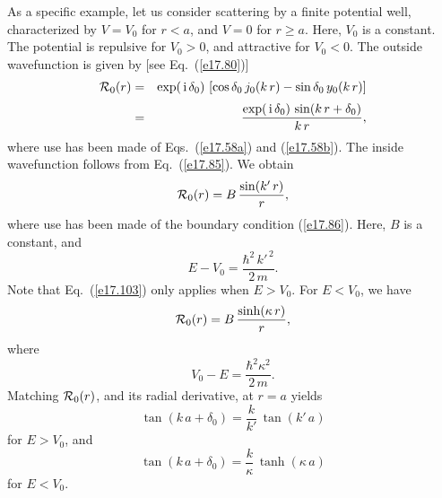As a specific example, let us consider scattering by  a finite
potential well, characterized by $V=V_0$ for $r<a$, and
$V=0$ for $r\geq a$. Here, $V_0$ is a constant. The potential
is repulsive for $V_0>0$, and attractive for $V_0<0$. 
The outside wavefunction is given by [see Eq.~(\ref{e17.80})]
\begin{eqnarray}
{\cal R}_0(r) &=& \exp(\,{\rm i}\, \delta_0)\,\left[
\cos\delta_0\,j_0(k\,r)  - \sin\delta_0\,y_0(k\,r) \right]\nonumber\\[0.5ex]
&=& \frac{ \exp(\,{\rm i} \,\delta_0)\, \sin(k\,r+\delta_0)}{k\,r},
\end{eqnarray}
where use has been made of Eqs.~(\ref{e17.58a}) and (\ref{e17.58b}).
The inside wavefunction follows from Eq.~(\ref{e17.85}). We obtain
\begin{equation}\label{e17.103}
{\cal R}_0(r) = B \,\frac{\sin (k'\,r)}{r},
\end{equation}
where use has been made of the boundary condition (\ref{e17.86}).
Here, $B$ is a constant, and 
\begin{equation}
E - V_0 = \frac{\hbar^2 \,k'^{\,2}}{2\,m}.
\end{equation}
Note that Eq.~(\ref{e17.103}) only applies when $E>V_0$. For $E<V_0$, we have
\begin{equation}
{\cal R}_0(r) = B \,\frac{\sinh(\kappa\, r)}{r},
\end{equation}
where
\begin{equation}
V_0 - E = \frac{\hbar^2 \kappa^2}{2\,m}.
\end{equation}
Matching ${\cal R}_0(r)$, and its radial derivative, at $r=a$ yields
\begin{equation}\label{e17.107}
\tan(k\,a+\delta_0) = \frac{k}{k'} \,\tan( k'\,a)
\end{equation}
for $E>V_0$, and
\begin{equation}
\tan(k\,a+ \delta_0) = \frac{k}{\kappa} \,\tanh( \kappa\, a)
\end{equation}
for $E<V_0$.

